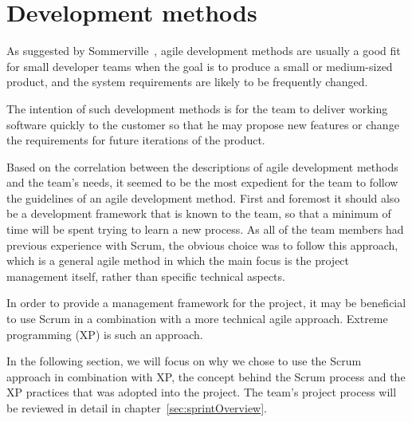 \section{Development methods}

As suggested by Sommerville~\cite{scrum}, agile development methods are usually a good fit for small developer teams when the goal is to produce a small or medium-sized product, and the system requirements are likely to be frequently changed.

The intention of such development methods is for the team to deliver working software quickly to the customer so that he may propose new features or change the requirements for future iterations of the product.

Based on the correlation between the descriptions of agile development methods and the team's needs, it seemed to be the most expedient for the team to follow the guidelines of an agile development method. First and foremost it should also be a development framework that is known to the team, so that a minimum of time will be spent trying to learn a new process. As all of the team members had previous experience with Scrum, the obvious choice was to follow this approach, which is a general agile method in which the main focus is the project management itself, rather than specific technical aspects.

In order to provide a management framework for the project, it may be beneficial to use Scrum in a combination with a more technical agile approach. Extreme programming (XP) is such an approach.

In the following section, we will focus on why we chose to use the Scrum approach in combination with XP, the concept behind the Scrum process and the XP practices that was adopted into the project. The team's project process will be reviewed in detail in chapter~\ref{sec:sprintOverview}.